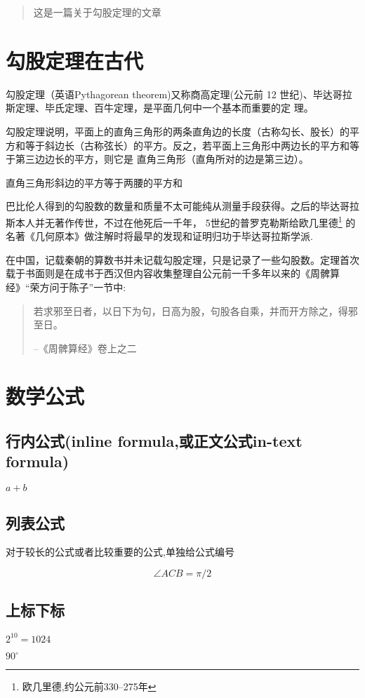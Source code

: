 \documentclass[UTF8]{ctexart}
\author{张三}
\date{\today}
\begin{document}
  \maketitle %
  \begin{abstract}
    这是一篇关于勾股定理的文章
  \end{abstract}
  \tableofcontents %
  \section{勾股定理在古代}
    勾股定理（英语Pythagorean theorem)又称商高定理(公元前 12 世纪)、毕达哥拉斯定理、毕氏定理、百牛定理，是平面几何中一个基本而重要的定 理。%

    勾股定理说明，平面上的直角三角形的两条直角边的长度（古称勾长、股长）的平方和等于斜边长（古称弦长）的平方。反之，若平面上三角形中两边长的平方和等于第三边边长的平方，则它是
    直角三角形（直角所对的边是第三边）。

    \begin{thm}[勾股定理]
      直角三角形斜边的平方等于两腰的平方和
    \end{thm}

    巴比伦人得到的勾股数的数量和质量不太可能纯从测量手段获得。之后的毕达哥拉斯本人并无著作传世，不过在他死后一千年，
    5世纪的普罗克勒斯给欧几里德\footnote{欧几里德,约公元前330--275年}
    的名著《几何原本》做注解时将最早的发现和证明归功于毕达哥拉斯学派.

    在中国，记载秦朝的算数书并未记载勾股定理，只是记录了一些勾股数。定理首次载于书面则是在成书于西汉但内容收集整理自公元前一千多年以来的《周髀算经》“荣方问于陈子”一节中:
    \begin{quote}%
    \kaishu%
      若求邪至日者，以日下为句，日高为股，句股各自乘，并而开方除之，得邪至日。

      --《周髀算经》卷上之二
    \end{quote}

  \section{数学公式}
    \subsection{行内公式(inline formula,或正文公式in-text formula)}
      $a+b$
    \subsection{列表公式}
      对于较长的公式或者比较重要的公式,单独给公式编号

      \begin{equation}
        \angle ACB = \pi /2
      \end{equation}
    \subsection{上标下标}

      $2^{10} = 1024$

      $90^\circ$
\end{document}
